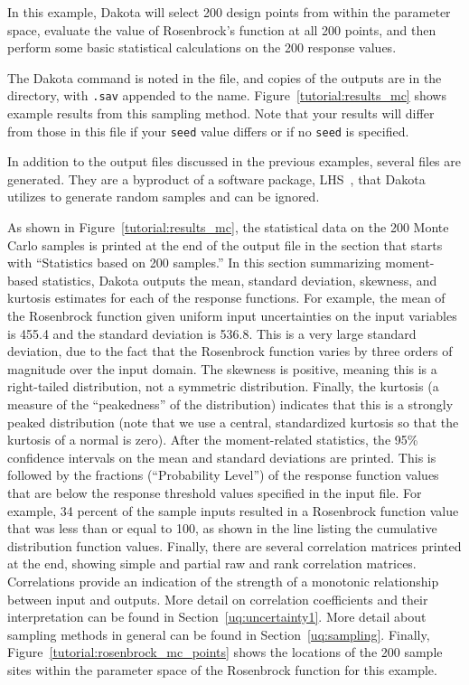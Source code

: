 In this example, Dakota will select 200 design points from within the
parameter space, evaluate the value of Rosenbrock's function at all
200 points, and then perform some basic statistical calculations on
the 200 response values.

The Dakota command is noted in the file, and copies of the outputs are
in the  directory, with
\texttt{.sav} appended to the name.  Figure~\ref{tutorial:results_mc}
shows example results from this sampling method.  Note that your
results will differ from those in this file if your \texttt{seed}
value differs or if no \texttt{seed} is specified.

In addition to the output files discussed in the previous examples, several
 files are generated. They are a byproduct of a software
package, LHS~\cite{Swi04}, that Dakota utilizes to generate random samples and
can be ignored.

As shown in Figure~\ref{tutorial:results_mc}, 
the statistical data on the 200 Monte Carlo samples is printed at the
end of the output file in the section that starts with ``Statistics
based on 200 samples.'' In this section summarizing 
moment-based statistics, Dakota outputs the
mean, standard deviation, skewness, and kurtosis estimates 
for each of the response functions. For example, 
the mean of the Rosenbrock function given uniform input uncertainties 
on the input variables is 455.4 and the standard deviation is 536.8. 
This is a very large standard deviation, due to the fact that the 
Rosenbrock function varies by three orders of magnitude over the input 
domain. The skewness is positive, meaning this is a right-tailed distribution, 
not a symmetric distribution. Finally, the kurtosis (a measure of the 
``peakedness'' of the distribution) indicates that 
this is a strongly peaked distribution (note that we use a central, 
standardized kurtosis so that the kurtosis of a normal is zero). 
After the moment-related statistics, the 95\% confidence intervals on the 
mean and standard deviations are printed. This is followed by
the fractions (``Probability Level'') of the response function values 
that are below the response threshold values specified in the input file. 
For example, 34 percent of the sample inputs resulted in a Rosenbrock 
function value that was less than or equal to 100, as shown in the line 
listing the cumulative distribution function values. 
Finally, there are several 
correlation matrices printed at the end, showing simple and partial 
raw and rank correlation matrices. Correlations provide an indication 
of the strength of a monotonic relationship between input and outputs. 
More detail on correlation coefficients and their interpretation can be 
found in Section~\ref{uq:uncertainty1}. 
More detail about sampling methods in general can be found in 
Section~\ref{uq:sampling}. Finally,  
Figure~\ref{tutorial:rosenbrock_mc_points} shows the locations
of the 200 sample sites within the parameter space of the Rosenbrock
function for this example.

